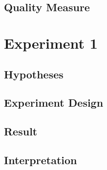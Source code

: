 \documentclass[./\jobname.tex]{subfiles}
\begin{document}
\begin{table}[h]
{\begin{tabular}{|c|c|c|c|c|c|}
			
			
			
		\end{tabular}
	}
	\label{tab:testbed}
\end{table}


\subsection{Quality Measure}

\section {Experiment 1}

\subsection{Hypotheses}

\subsection{Experiment Design}

\subsection{Result}

\subsection{Interpretation}
\end{document}
